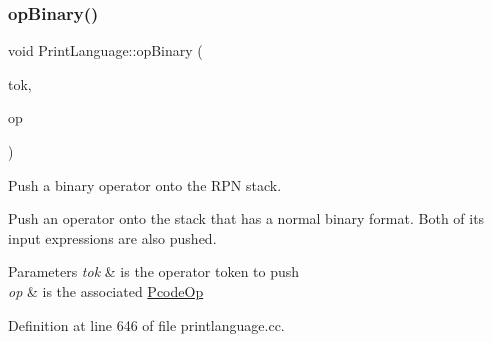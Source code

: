 \subsubsection{\texorpdfstring{opBinary()}{opBinary()}}
{\footnotesize\ttfamily void Print\+Language\+::op\+Binary (\begin{DoxyParamCaption}\item[{const \mbox{\hyperlink{class_op_token}{Op\+Token}} $\ast$}]{tok,  }\item[{const \mbox{\hyperlink{class_pcode_op}{Pcode\+Op}} $\ast$}]{op }\end{DoxyParamCaption})\hspace{0.3cm}{\ttfamily [protected]}}



Push a binary operator onto the R\+PN stack. 

Push an operator onto the stack that has a normal binary format. Both of its input expressions are also pushed. 
\begin{DoxyParams}{Parameters}
{\em tok} & is the operator token to push \\
\hline
{\em op} & is the associated \mbox{\hyperlink{class_pcode_op}{Pcode\+Op}} \\
\hline
\end{DoxyParams}


Definition at line 646 of file printlanguage.\+cc.

